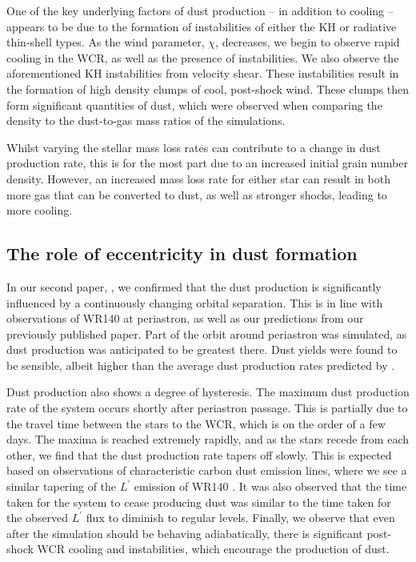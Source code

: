 One of the key underlying factors of dust production -- in addition to cooling -- appears to be due to the formation of instabilities of either the KH or radiative thin-shell types.
As the wind parameter, $\chi$, decreases, we begin to observe rapid cooling in the WCR, as well as the presence of instabilities.
We also observe the aforementioned KH instabilities from velocity shear.
These instabilities result in the formation of high density clumps of cool, post-shock wind.
These clumps then form significant quantities of dust, which were observed when comparing the density to the dust-to-gas mass ratios of the simulations.

Whilst varying the stellar mass loss rates can contribute to a change in dust production rate, this is for the most part due to an increased initial grain number density.
However, an increased mass loss rate for either star can result in both more gas that can be converted to dust, as well as stronger shocks, leading to more cooling.

\subsection{The role of eccentricity in dust formation}

In our second paper, \emph{\secondpapertitle} \parencite{eatsonExploringDustGrowth2022}, we confirmed that the dust production is significantly influenced by a continuously changing orbital separation.
This is in line with observations of WR140 at periastron, as well as our predictions from our previously published paper.
Part of the orbit around periastron was simulated, as dust production was anticipated to be greatest there.
Dust yields were found to be sensible, albeit higher than the average dust production rates predicted by \textcite{lauRevisitingImpactDust2020}.

Dust production also shows a degree of hysteresis.
The maximum dust production rate of the system occurs shortly after periastron passage.
This is partially due to the travel time between the stars to the WCR, which is on the order of a few days.
The maxima is reached extremely rapidly, and as the stars recede from each other, we find that the dust production rate tapers off slowly.
This is expected based on observations of characteristic carbon dust emission lines, where we see a similar tapering of the $L^\prime$ emission of WR140 \parencite{crowther_dust_2003}.
It was also observed that the time taken for the system to cease producing dust was similar to the time taken for the observed $L^\prime$ flux to diminish to regular levels.
Finally, we observe that even after the simulation should be behaving adiabatically, there is significant post-shock WCR cooling and instabilities, which encourage the production of dust.

